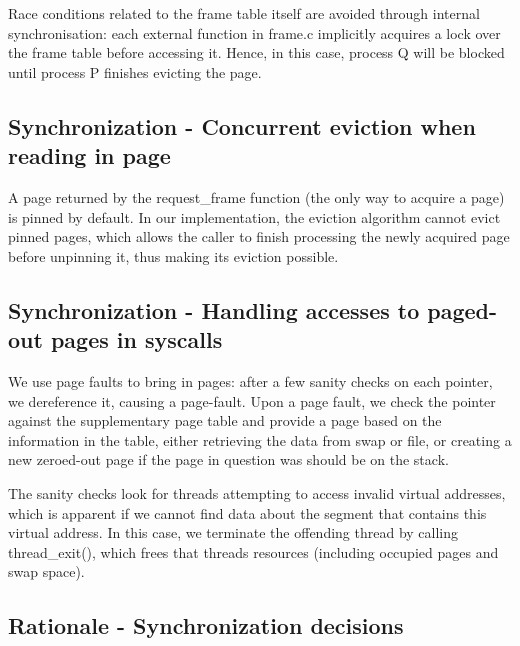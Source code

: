 Race conditions related to the frame table itself are avoided through internal synchronisation: each external function in frame.c implicitly acquires a lock over the frame table before accessing it.
Hence, in this case, process Q will be blocked until process P finishes evicting the page.

\subsection{Synchronization - Concurrent eviction when reading in page}

A page returned by the request\_frame function (the only way to acquire a page) is pinned by default.
In our implementation, the eviction algorithm cannot evict pinned pages, which allows the caller to finish processing the newly acquired page before unpinning it, thus making its eviction possible.

\subsection{Synchronization - Handling accesses to paged-out pages in syscalls}

We use page faults to bring in pages: after a few sanity checks on each pointer, we dereference it, causing a page-fault.
Upon a page fault, we check the pointer against the supplementary page table and provide a page based on the information in the table, either retrieving the data from swap or file, or creating a new zeroed-out page if the page in question was should be on the stack.

The sanity checks look for threads attempting to access invalid virtual addresses, which is apparent if we cannot find data about the segment that contains this virtual address. In this case, we terminate the offending thread by calling thread\_exit(), which frees that threads resources (including occupied pages and swap space).

\subsection{Rationale - Synchronization decisions}

